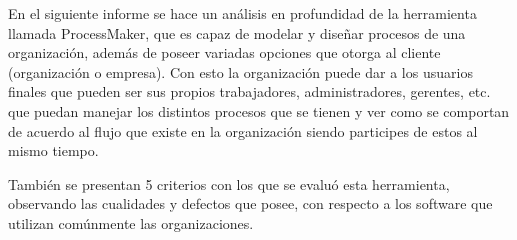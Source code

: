 En el siguiente informe se hace un análisis en profundidad de la herramienta llamada ProcessMaker, que es capaz de modelar y diseñar procesos de una organización,  además de poseer variadas opciones que otorga al cliente (organización o empresa). Con esto la organización puede dar a los usuarios finales que pueden ser sus propios trabajadores, administradores, gerentes, etc. que puedan manejar los distintos procesos que se tienen y ver como se comportan de acuerdo al flujo que existe en la organización siendo participes de estos al mismo tiempo.

También se presentan 5 criterios con los que se evaluó esta herramienta, observando las cualidades y defectos que posee, con respecto a los software que utilizan comúnmente las organizaciones.